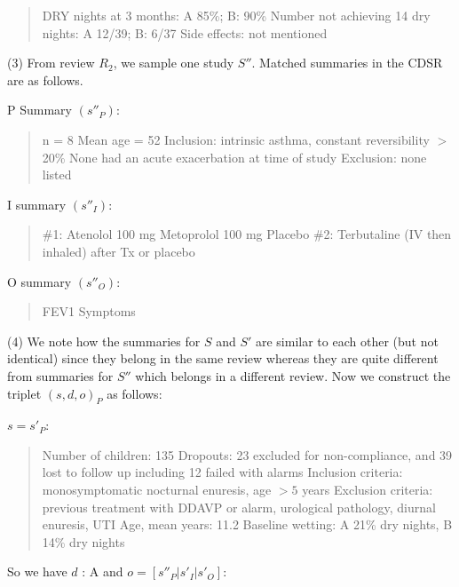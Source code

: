 \documentclass[11pt,a4paper]{article}
\begin{document}
{\footnotesize \begin{quote} DRY nights at 3 months: A 85\%; B: 90\% Number not achieving 14 dry nights: A 12/39; B: 6/37 Side effects: not mentioned \end{quote}}

\vspace{1em}
(3) From review $R_2$, we sample one study $S''$. Matched summaries in the CDSR are as follows. 

\noindent P Summary $(s''_P)$: 

{\footnotesize \begin{quote} n = 8 Mean age = 52 Inclusion: intrinsic asthma, constant reversibility $>$ 20\% None had an acute exacerbation at time of study Exclusion: none listed \end{quote}}

\noindent I summary $(s''_I)$:

{\footnotesize \begin{quote} \#1: Atenolol 100 mg Metoprolol 100 mg Placebo \#2: Terbutaline (IV then inhaled) after Tx or placebo \end{quote}}

\noindent O summary $(s''_O)$: 

{\footnotesize \begin{quote} FEV1 Symptoms \end{quote}}

\vspace{1em}

(4) We note how the summaries for $S$ and $S'$ are similar to each other (but not identical) since they belong in the same review whereas they are quite different from summaries for $S''$ which belongs in a different review. Now we construct the triplet $(s, d, o)_P$ as follows:

\vspace{1em}
\noindent $s = s'_P$:

{\footnotesize \begin{quote} Number of children: 135 Dropouts: 23 excluded for non-compliance, and 39 lost to follow up including 12 failed with alarms Inclusion criteria: monosymptomatic nocturnal enuresis, age $>5$ years Exclusion criteria: previous treatment with DDAVP or alarm, urological pathology, diurnal enuresis, UTI Age, mean years: 11.2  Baseline wetting: A 21\% dry nights, B 14\% dry nights\end{quote}}

\noindent So we have $d$ : A and $o = [s''_P|s'_I|s'_O]$: 
\end{document}
